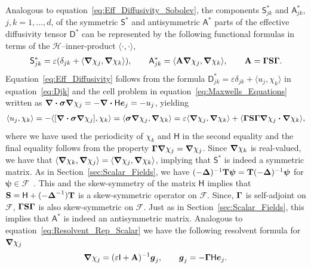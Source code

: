 \documentclass[leqno,onefignum,onetabnum]{siamltex1213}
\newcommand{\secref}[1]{Section~\ref{#1}}
\newcommand{\Mb}{\mathbf{M}}
\newcommand{\Tb}{\mathbf{T}}
\newcommand{\Sb}{\mathbf{S}}
\newcommand{\Ab}{\mathbf{A}}
\newcommand{\bI}{\mathbf{I}}
\newcommand{\Hc}{\mathcal{H}}
\newcommand{\Fc}{\mathcal{F}}
\newcommand{\Dm}{\mathsf{D}}
\newcommand{\Hm}{\mathsf{H}}
\newcommand{\Sm}{\mathsf{S}}
\newcommand{\Am}{\mathsf{A}}
\newcommand{\Ib}{\mathsf{I}}
\newcommand\bsig{\mbox{\boldmath${\sigma}$}}
\newcommand\bDelta{\mbox{\boldmath${\Delta}$}}
\newcommand\bGamma{\mbox{\boldmath${\Gamma}$}}
\newcommand\bnabla{\mbox{\boldmath${\nabla}$}}
\providecommand\bcdot{\boldsymbol{\cdot}}
\newcommand{\vecg}{\boldsymbol{g}}
\newcommand{\vece}{\boldsymbol{e}}
\newcommand{\vecpsi}{\boldsymbol{\psi}}
\begin{document}
Analogous to equation~\eqref{eq:Eff_Diffusivity_Sobolev}, the
components $\Sm^*_{jk}$ and $\Am^*_{jk}$, $j,k=1,\ldots,d$, of the
symmetric $\Sm^*$ and antisymmetric $\Am^*$ parts of the effective
diffusivity tensor $\Dm^*$ can be represented by the following
functional formulas in terms of the $\Hc$--inner-product $\langle\cdot,\cdot\rangle$,
%
\begin{align}\label{eq:Eff_Diffusivity}
 \Sm^*_{jk}=\varepsilon(\delta_{jk}+\langle\bnabla \chi_j,\bnabla \chi_k\rangle), 
  \qquad
 \Am^*_{jk}=\langle\Ab\bnabla \chi_j,\bnabla \chi_k\rangle, 
  \qquad
 \Ab=\bGamma\Sb\bGamma.
\end{align}
%
Equation~\eqref{eq:Eff_Diffusivity} follows from the formula
$\Dm^*_{jk}=\varepsilon\delta_{jk}+\langle u_j,\chi_k\rangle$ in equation~\eqref{eq:Djk} and the
cell problem in equation~\eqref{eq:Maxwells_Equations} written as
$\bnabla\bcdot\bsig\bnabla\chi_j=-\bnabla\bcdot\Hm\vece_j=-u_j$, yielding 
%
\begin{align}\label{eq:Functional_Rep}
  \langle u_j,\chi_k\rangle=-\langle[\bnabla\bcdot\bsig\bnabla\chi_j],\chi_k\rangle
       =\langle\bsig\bnabla\chi_j,\bnabla\chi_k\rangle      
       =\varepsilon\langle\bnabla\chi_j,\bnabla\chi_k\rangle
         +\langle\bGamma\Sb\bGamma\bnabla\chi_j\bcdot\bnabla\chi_k\rangle,       
\end{align}
%
where we have used the periodicity of $\chi_k$ and $\Hm$ in the second
equality and the final equality follows from the property
$\bGamma\bnabla\chi_j=\bnabla\chi_j$. Since $\bnabla\chi_k$ is
real-valued, we have that
$\langle\bnabla\chi_k,\bnabla\chi_j\rangle=\langle\bnabla\chi_j,\bnabla\chi_k\rangle$, implying that
$\Sm^*$ is indeed a symmetric matrix. As in
\secref{sec:Scalar_Fields}, we have
$(-\bDelta)^{-1}\Tb\vecpsi=\Tb(-\bDelta)^{-1}\vecpsi$ for
$\vecpsi\in\Fc$~\cite{Folland:99:RealAnalysis,Stakgold:BVP:2000}. This
and the skew-symmetry of the matrix $\Hm$ implies that
$\Sb=\Hm+(-\bDelta^{-1})\Tb$ is a skew-symmetric operator on
$\Fc$. Since, $\bGamma$ is self-adjoint on $\Fc$, $\bGamma\Sb\bGamma$
is also skew-symmetric on $\Fc$. Just as in
\secref{sec:Scalar_Fields}, this implies that $\Am^*$ is indeed an
antisymmetric matrix. Analogous to
equation~\eqref{eq:Resolvent_Rep_Scalar} we have the following
resolvent formula for $\bnabla\chi_j$
% 
\begin{align}\label{eq:Resolvent_Rep}
  \bnabla \chi_j=(\varepsilon\Ib+\Ab)^{-1}\vecg_j,
  \qquad
  \vecg_j=-\bGamma\Hm\vece_j.
\end{align}
\end{document}
